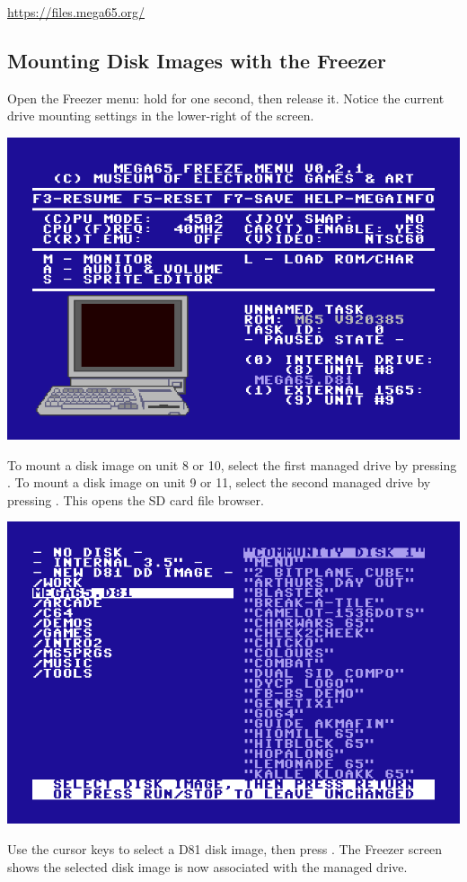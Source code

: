 \url{https://files.mega65.org/}

\subsection{Mounting Disk Images with the Freezer}

Open the Freezer menu: hold  for one second, then release it. Notice the current drive mounting settings in the lower-right of the screen.

\begin{center}
  \includegraphics[width=0.7\linewidth]{images/freezer.png}
\end{center}

To mount a disk image on unit 8 or 10, select the first managed drive by pressing . To mount a disk image on unit 9 or 11, select the second managed drive by pressing . This opens the SD card file browser.

\begin{center}
  \includegraphics[width=0.7\linewidth]{images/d81-file-browser.png}
\end{center}

Use the cursor keys to select a D81 disk image, then press . The Freezer screen shows the selected disk image is now associated with the managed drive.

